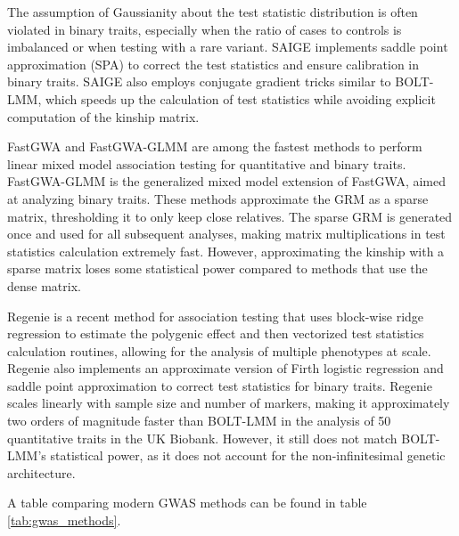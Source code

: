 The assumption of Gaussianity about the test statistic distribution is often violated in binary traits, especially when the ratio of cases to controls is imbalanced or when testing with a rare variant. SAIGE \cite{zhou2018efficiently} implements saddle point approximation (SPA) \cite{kuonen1999miscellanea,dey2017fast} to correct the test statistics and ensure calibration in binary traits. SAIGE also employs conjugate gradient tricks similar to BOLT-LMM, which speeds up the calculation of test statistics while avoiding explicit computation of the kinship matrix.

FastGWA \cite{jiang2019resource} and FastGWA-GLMM \cite{jiang2021generalized} are among the fastest methods to perform linear mixed model association testing for quantitative and binary traits. FastGWA-GLMM is the generalized mixed model extension of FastGWA, aimed at analyzing binary traits. These methods approximate the GRM as a sparse matrix, thresholding it to only keep close relatives. The sparse GRM is generated once and used for all subsequent analyses, making matrix multiplications in test statistics calculation extremely fast. However, approximating the kinship with a sparse matrix loses some statistical power compared to methods that use the dense matrix.

Regenie \cite{mbatchou2021computationally} is a recent method for association testing that uses block-wise ridge regression to estimate the polygenic effect and then vectorized test statistics calculation routines, allowing for the analysis of multiple phenotypes at scale. Regenie also implements an approximate version of Firth logistic regression and saddle point approximation to correct test statistics for binary traits. Regenie scales linearly with sample size and number of markers, making it approximately two orders of magnitude faster than BOLT-LMM in the analysis of 50 quantitative traits in the UK Biobank. However, it still does not match BOLT-LMM's statistical power, as it does not account for the non-infinitesimal genetic architecture.

A table comparing modern GWAS methods can be found in table \ref{tab:gwas_methods}. 


